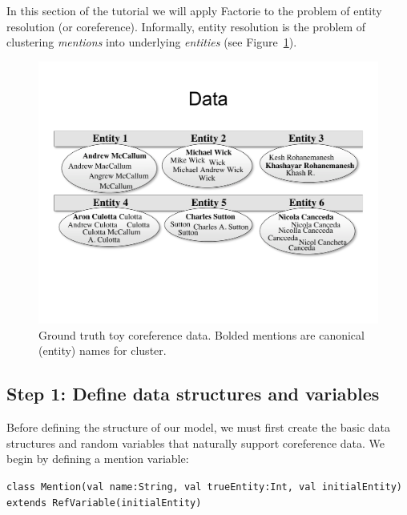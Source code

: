 \documentclass[]{manual}
\newcommand{\cut}[1]{}
\begin{document}
In this section of the tutorial we will apply Factorie to the problem
of entity resolution (or coreference). \cut{Entity resolution is a problem
studied in many scientific communities, including natural language
processing, information extraction, data mining, and information
integration, as well as industry.} Informally, entity resolution is the
problem of clustering {\em mentions} into underlying {\em
  entities} (see Figure~\ref{fig:tutorial-coref-toy-data}).


\cut{Throughout this section we will highlight the power of several of
Factorie's types of imperativisms, including variable coordination,
online constraint preservation,sufficient statistics mapping, and
unrolling.}


\begin{figure}[h]
\begin{center}
\includegraphics[width=0.88 \textwidth]{figs/coref-toy-data}
\caption{Ground truth toy coreference data. Bolded mentions are canonical (entity) names for cluster.}
\label{fig:tutorial-coref-toy-data}
\end{center}
\end{figure}


\subsection{Step 1: Define data structures and variables}
Before defining the structure of our model, we must
first create the basic data structures and random variables that
naturally support coreference data. We begin by defining a mention
variable:

\lstinline!class Mention(val name:String, val trueEntity:Int, val initialEntity) extends RefVariable(initialEntity)!
\end{document}
